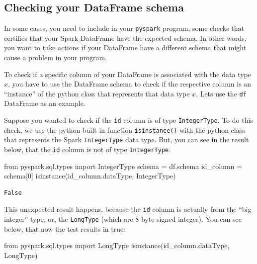 \documentclass[
  11pt,
  letterpaper,
  DIV=11,
  numbers=noendperiod]{scrreprt}
\newenvironment{Shaded}{\begin{snugshade}}{\end{snugshade}}
\newcommand{\BuiltInTok}[1]{\textcolor[rgb]{0.00,0.23,0.31}{#1}}
\newcommand{\DecValTok}[1]{\textcolor[rgb]{0.68,0.00,0.00}{#1}}
\newcommand{\ImportTok}[1]{\textcolor[rgb]{0.00,0.46,0.62}{#1}}
\newcommand{\NormalTok}[1]{\textcolor[rgb]{0.00,0.23,0.31}{#1}}
\newcommand{\OperatorTok}[1]{\textcolor[rgb]{0.37,0.37,0.37}{#1}}
\begin{document}
\hypertarget{checking-your-dataframe-schema}{%
\subsection{Checking your DataFrame
schema}\label{checking-your-dataframe-schema}}

In some cases, you need to include in your \texttt{pyspark} program,
some checks that certifies that your Spark DataFrame have the expected
schema. In other words, you want to take actions if your DataFrame have
a different schema that might cause a problem in your program.

To check if a specific column of your DataFrame is associated with the
data type \(x\), you have to use the DataFrame schema to check if the
respective column is an ``instance'' of the python class that represents
that data type \(x\). Lets use the \texttt{df} DataFrame as an example.

Suppose you wanted to check if the \texttt{id} column is of type
\texttt{IntegerType}. To do this check, we use the python built-in
function \texttt{isinstance()} with the python class that represents the
Spark \texttt{IntegerType} data type. But, you can see in the result
below, that the \texttt{id} column is not of type \texttt{IntegerType}.

\begin{Shaded}
\begin{Highlighting}[]
\ImportTok{from}\NormalTok{ pyspark.sql.types }\ImportTok{import}\NormalTok{ IntegerType}
\NormalTok{schema }\OperatorTok{=}\NormalTok{ df.schema}
\NormalTok{id\_column }\OperatorTok{=}\NormalTok{ schema[}\DecValTok{0}\NormalTok{]}
\BuiltInTok{isinstance}\NormalTok{(id\_column.dataType, IntegerType)}
\end{Highlighting}
\end{Shaded}

\begin{verbatim}
False
\end{verbatim}

This unexpected result happens, because the \texttt{id} column is
actually from the ``big integer'' type, or, the \texttt{LongType} (which
are 8-byte signed integer). You can see below, that now the test results
in true:

\begin{Shaded}
\begin{Highlighting}[]
\ImportTok{from}\NormalTok{ pyspark.sql.types }\ImportTok{import}\NormalTok{ LongType}
\BuiltInTok{isinstance}\NormalTok{(id\_column.dataType, LongType)}
\end{Highlighting}
\end{Shaded}
\end{document}
